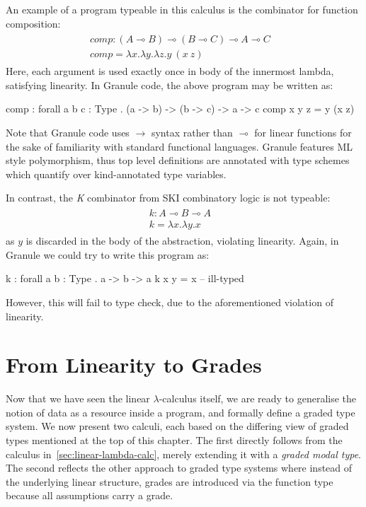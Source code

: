 \begin{example}
  \label{example:linear-granule}
An example of a program typeable in this calculus is the combinator for function
composition: 
\begin{align*}
\begin{array}{ll}
    comp: (A \multimap B) \multimap (B \multimap C) \multimap A \multimap C &
    \\
    comp = \lambda x. \lambda y. \lambda z. y\ (x\ z) &
\end{array}  
\end{align*}
Here, each argument is used exactly once in body of the innermost lambda, satisfying 
linearity. In Granule code, the above program may be written as:
\begin{granule}
comp : forall { a b c : Type } . (a -> b) -> (b -> c) -> a -> c
comp x y z = y (x z)
\end{granule}
Note that Granule code uses $\rightarrow$ syntax rather than $\multimap$ for
linear functions for the sake of familiarity with standard functional languages.
Granule features ML style polymorphism, thus top level definitions are annotated
with type schemes which quantify over kind-annotated type variables.

In contrast, the \emph{K} combinator from SKI combinatory logic is not typeable:
\label{k-example}
\begin{align*}
  \tag{ill-typed}
\begin{array}{ll}
    k : A \multimap B \multimap A &
    \\
    k = \lambda x. \lambda y. x &
\end{array}  
\end{align*}
as $y$ is discarded in the body of the abstraction, violating linearity. Again, 
in Granule we could try to write this program as:
\begin{granule}
k : forall { a b : Type } . a -> b -> a
k x y = x                  -- ill-typed
\end{granule}
However, this will fail to type check, due to the aforementioned violation of
linearity.
\end{example}

\section{From Linearity to Grades}
\label{sec:graded-linear}
Now that we have seen the linear $\lambda$-calculus itself, we are ready to
generalise the notion of data as a resource inside a program, and formally
define a graded type system. We now present two calculi, each based on the
differing view of graded types mentioned at the top of this chapter. The first
directly follows from the calculus in~\ref{sec:linear-lambda-calc}, merely
extending it with a \emph{graded modal type}. The second reflects the other
approach to graded type systems where instead of the underlying linear
structure, grades are introduced via the function type because all assumptions
carry a grade.

